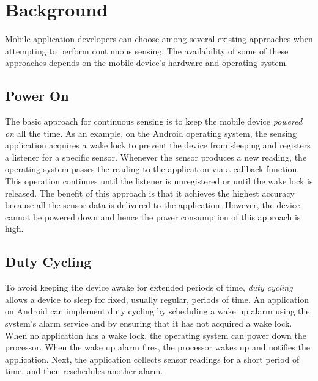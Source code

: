 
\section{Background}
\label{sec:background}

Mobile application developers can choose among several existing approaches when
attempting to perform continuous sensing. The availability of some of these
approaches depends on the mobile device's hardware and operating system.

\subsection{Power On}

The basic approach for continuous sensing is to keep the mobile device
\emph{powered on} all the time. As an example, on the Android operating system,
the sensing application acquires a wake lock to prevent the device from sleeping
and registers a listener for a specific sensor. Whenever the sensor produces a
new reading, the operating system passes the reading to the application via a
callback function. This operation continues until the listener is unregistered
or until the wake lock is released. The benefit of this approach is that it
achieves the highest accuracy because all the sensor data is delivered to the
application. However, the device cannot be powered down and hence the power
consumption of this approach is high.

\subsection{Duty Cycling}

To avoid keeping the device awake for extended periods of time, \emph{duty
  cycling} allows a device to sleep for fixed, usually regular, periods of
time. An application on Android can implement duty cycling by scheduling a wake
up alarm using the system's alarm service and by ensuring that it has not
acquired a wake lock. When no application has a wake lock, the operating system
can power down the processor. When the wake up alarm fires, the processor wakes
up and notifies the application. Next, the application collects sensor readings
for a short period of time, and then reschedules another alarm.


